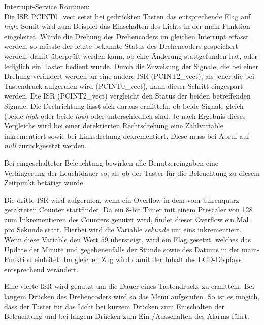 \documentclass[journal, a4paper]{IEEEtran}
\begin{document}
	Interrupt-Service Routinen:\\
	Die ISR PCINT0\_vect setzt bei gedrückten Tasten das entsprechende Flag auf \emph{high}. Somit wird zum Beispiel das Einschalten des Lichts in der main-Funktion eingeleitet.
	Würde die Drehung des Drehencoders im gleichen Interrupt erfasst werden, so müsste der letzte bekannte Status des Drehencoders gespeichert werden, damit überprüft werden kann, ob eine Änderung stattgefunden hat, oder lediglich ein Taster bedient wurde. Durch die Zuweisung der Signale, die bei einer Drehung verändert werden an eine andere ISR (PCINT2\_vect), als jener die bei Tastendruck aufgerufen wird (PCINT0\_vect), kann dieser Schritt eingespart werden. Die ISR (PCINT2\_vect) vergleicht den Status der beiden betreffenden Signale. Die Drehrichtung lässt sich daraus ermitteln, ob beide Signale gleich (beide \emph{high} oder beide \emph{low}) oder unterschiedlich sind. Je nach Ergebnis dieses Vergleichs wird bei einer detektierten Rechtsdrehung eine Zählvariable inkrementiert sowie bei Linksdrehung dekrementiert. Diese muss bei Abruf auf \emph{null} zurückgesetzt werden.\par 
	Bei eingeschalteter Beleuchtung bewirken alle Benutzereingaben eine Verlängerung der Leuchtdauer so, als ob der Taster für die Beleuchtung zu diesem Zeitpunkt betätigt wurde.\par
	Die dritte ISR wird aufgerufen, wenn ein Overflow in dem vom Uhrenquarz getakteten Counter stattfindet. Da ein 8-bit Timer mit einem Prescaler von 128 zum Inkrementieren des Counters genutzt wird, findet dieser Overflow ein Mal pro Sekunde statt. Hierbei wird die Variable \emph{sekunde} um eins inkrementiert. Wenn diese Variable den Wert $59$ übersteigt, wird ein Flag gesetzt, welches das Update der Minute und gegebenenfalls der Stunde sowie des Datums in der main-Funktion einleitet. Im gleichen Zug wird damit der Inhalt des LCD-Displays entsprechend verändert.\par
	Eine vierte ISR wird genutzt um die Dauer eines Tastendrucks zu ermitteln. Bei langem Drücken des Drehencoders wird so das Menü aufgerufen. So ist es mögich, dass der Taster für das Licht bei kurzem Drücken zum Einschalten der Beleuchtung und bei langem Drücken zum Ein-/Ausschalten des Alarms führt.
	
\end{document}
